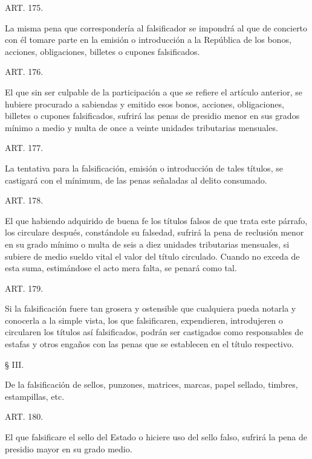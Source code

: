     ART. 175.

    La misma pena que correspondería al falsificador se impondrá al que de concierto con él tomare parte en la emisión o introducción a la República de los bonos, acciones, obligaciones, billetes o cupones falsificados.


    ART. 176.

    El que sin ser culpable de la participación a que se refiere el artículo anterior, se hubiere procurado a sabiendas y emitido esos bonos, acciones, obligaciones, billetes o cupones falsificados, sufrirá las penas de presidio menor en sus grados mínimo a medio y multa de once a veinte unidades tributarias mensuales.








    ART. 177.

    La tentativa para la falsificación, emisión o introducción de tales títulos, se castigará con el mínimum, de las penas señaladas al delito consumado.




    ART. 178.

    El que habiendo adquirido de buena fe los títulos falsos de que trata este párrafo, los circulare después, constándole su falsedad, sufrirá la pena de reclusión menor en su grado mínimo o multa de seis a diez unidades tributarias mensuales, si subiere de medio sueldo vital el valor del título circulado.
    Cuando no exceda de esta suma, estimándose el acto mera falta, se penará como tal.





    ART. 179.

    Si la falsificación fuere tan grosera y ostensible que cualquiera pueda notarla y conocerla a la simple vista, los que falsificaren, expendieren, introdujeren o circularen los títulos así falsificados, podrán ser castigados como responsables de estafas y otros engaños con las penas que se establecen en el título respectivo.

    § III.

De la falsificación de sellos, punzones, matrices, marcas, papel sellado, timbres, estampillas, etc.





    ART. 180.

    El que falsificare el sello del Estado o hiciere uso del sello falso, sufrirá la pena de presidio mayor en su grado medio.


